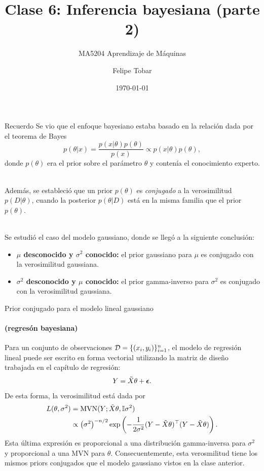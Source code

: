 \documentclass[9pt, handout]{beamer}
\title{Clase 6: Inferencia bayesiana (parte 2)}
\subtitle{MA5204 Aprendizaje de Máquinas}
\date{\today}
\author{Felipe Tobar}
\institute{Department of Mathematical Engineering \&\\ Center for Mathematical Modelling\\Universidad de Chile}
\begin{document}
\begin{frame}
  \titlepage
\end{frame}

\begin{frame}{Recuerdo}
Se vio que el enfoque bayesiano estaba basado en la relación dada por el teorema de Bayes
	\begin{equation*}
	p(\theta|x) = \frac{p(x|\theta)p(\theta)}{p(x)} \propto p(x|\theta)p(\theta),\label{eq:Bayes}
\end{equation*}
donde $p(\theta)$ era el prior sobre el parámetro $\theta$ y contenía el conocimiento experto.\\~\ \pause

Además, se estableció que un prior $p(\theta)$ es \emph{conjugado} a la verosimilitud $p(D|\theta)$, cuando la posterior $p(\theta|D)$ está en la misma familia que el prior $p(\theta)$.\\~\ \pause

Se estudió el caso del modelo gaussiano, donde se llegó a la siguiente conclusión:

\begin{itemize}
	\item \textbf{$\mu$ desconocido y $\sigma^2$ conocido:} el prior gaussiano para $\mu$ es conjugado con la verosimilitud gaussiana.
	\item \textbf{$\sigma^2$ desconocido y $\mu$ conocido:} el prior gamma-inverso para $\sigma^2$ es conjugado con la verosimilitud gaussiana. 
\end{itemize}

\end{frame}

\begin{frame}{Prior conjugado para el modelo lineal gaussiano}
\framesubtitle{(regresón bayesiana)}

Para un conjunto de observaciones ${\mathcal D}=\{(x_i,y_i)\}_{i=1}^n$, el modelo de regresión lineal puede ser escrito en forma vectorial utilizando la matriz de diseño trabajada en el capítulo de regresión:
\begin{equation*}
 	Y = \tilde{X}\theta + {\bm \epsilon}.
 \end{equation*} \pause
De esta forma, la verosimilitud está dada por 
\begin{align*}
	L(\theta,\sigma^2) &= \operatorname{\text{MVN}}(Y; \tilde{X}\theta, {\mathbb I}\sigma^2)\\
					&\propto \left(\sigma^2\right)^{-n/2}   \exp\left(-\frac{1}{2\sigma^2} (Y - \tilde{X}\theta)^\top(Y - \tilde{X}\theta)\right).\nonumber
\end{align*} \pause
Esta última  expresión es proporcional a una distribución gamma-inversa para $\sigma^2$ y proporcional a una MVN para $\theta$. Consecuentemente, esta verosmilitud tiene los mismos priors conjugados que el modelo gaussiano vistos en la clase anterior. 
	
\end{frame}
\end{document}
